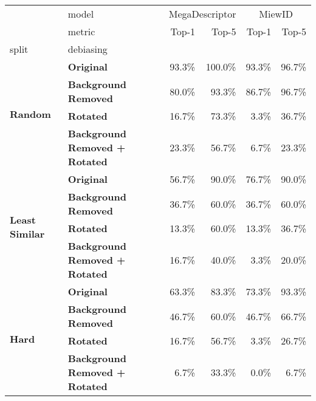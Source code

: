 \begin{tabular}{llrrrr}
\toprule
 & model & \multicolumn{2}{c}{MegaDescriptor} & \multicolumn{2}{c}{MiewID} \\
 & metric & Top-1 & Top-5 & Top-1 & Top-5 \\
split & debiasing &  &  &  &  \\
\midrule
\multirow[t]{4}{*}{\textbf{Random}} & \textbf{Original} & 93.3\% & 100.0\% & 93.3\% & 96.7\% \\
\textbf{} & \textbf{Background Removed} & 80.0\% & 93.3\% & 86.7\% & 96.7\% \\
\textbf{} & \textbf{Rotated} & 16.7\% & 73.3\% & 3.3\% & 36.7\% \\
\textbf{} & \textbf{Background Removed + Rotated} & 23.3\% & 56.7\% & 6.7\% & 23.3\% \\
\cline{1-6}
\multirow[t]{4}{*}{\textbf{Least Similar}} & \textbf{Original} & 56.7\% & 90.0\% & 76.7\% & 90.0\% \\
\textbf{} & \textbf{Background Removed} & 36.7\% & 60.0\% & 36.7\% & 60.0\% \\
\textbf{} & \textbf{Rotated} & 13.3\% & 60.0\% & 13.3\% & 36.7\% \\
\textbf{} & \textbf{Background Removed + Rotated} & 16.7\% & 40.0\% & 3.3\% & 20.0\% \\
\cline{1-6}
\multirow[t]{4}{*}{\textbf{Hard}} & \textbf{Original} & 63.3\% & 83.3\% & 73.3\% & 93.3\% \\
\textbf{} & \textbf{Background Removed} & 46.7\% & 60.0\% & 46.7\% & 66.7\% \\
\textbf{} & \textbf{Rotated} & 16.7\% & 56.7\% & 3.3\% & 26.7\% \\
\textbf{} & \textbf{Background Removed + Rotated} & 6.7\% & 33.3\% & 0.0\% & 6.7\% \\
\cline{1-6}
\bottomrule
\end{tabular}
